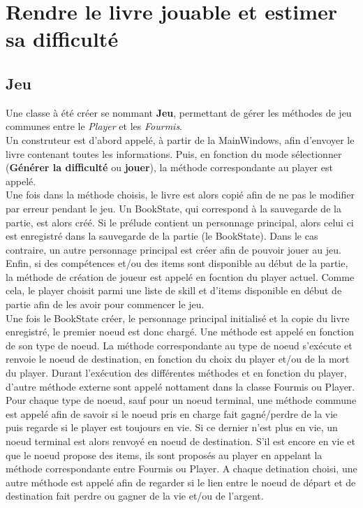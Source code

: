 	\section{Rendre le livre jouable et estimer sa difficulté}
		\subsection{Jeu}
		Une classe à été créer se nommant \textbf{Jeu}, permettant de gérer les méthodes de jeu communes entre le \textit{Player} et les \textit{Fourmis}.\\
		Un construteur est d'abord appelé, à partir de la MainWindows, afin d'envoyer le livre contenant toutes les informations. Puis, en fonction du mode sélectionner (\textbf{Générer la difficulté} ou \textbf{jouer}), la méthode correspondante au player est appelé.\\
		Une fois dans la méthode choisis, le livre est alors copié afin de ne pas le modifier par erreur pendant le jeu. Un BookState, qui correspond à la sauvegarde de la partie, est alors créé. Si le prélude contient un personnage principal, alors celui ci est enregistré dans la sauvegarde de la partie (le BookState). Dans le cas contraire, un autre personnage principal est créer afin de pouvoir jouer au jeu.\\
		Enfin, si des compétences et/ou des items sont disponible au début de la partie, la méthode de création de joueur est appelé en focntion du player actuel. Comme cela, le player choisit parmi une liste de skill et d'items disponible en début de partie afin de les avoir pour commencer le jeu.\\
		Une fois le BookState créer, le personnage principal initialisé et la copie du livre enregistré, le premier noeud est donc chargé. Une méthode est appelé en fonction de son type de noeud. La méthode correspondante au type de noeud s'exécute et renvoie le noeud de destination, en fonction du choix du player et/ou de la mort du player. Durant l'exécution des différentes méthodes et en fonction du player, d'autre méthode externe sont appelé nottament dans la classe Fourmis ou Player.\\
		Pour chaque type de noeud, sauf pour un noeud terminal, une méthode commune est appelé afin de savoir si le noeud pris en charge fait gagné/perdre de la vie puis regarde si le player est toujours en vie. Si ce dernier n'est plus en vie, un noeud terminal est alors renvoyé en noeud de destination. S'il est encore en vie et que le noeud propose des items, ils sont proposés au player en appelant la méthode correspondante entre Fourmis ou Player. A chaque detination choisi, une autre méthode est appelé afin de regarder si le lien entre le noeud de départ et de destination fait perdre ou gagner de la vie et/ou de l'argent.\\

